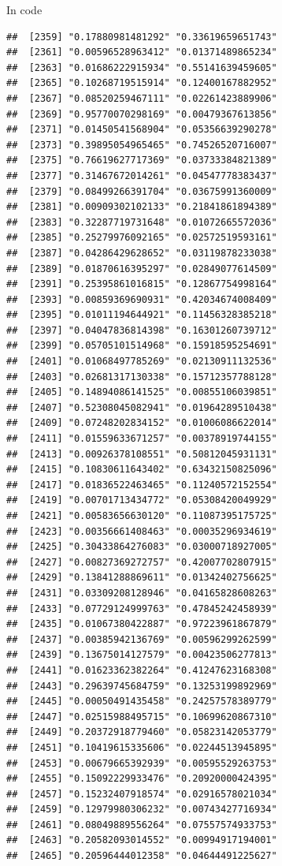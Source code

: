 \documentclass[ignorenonframetext,]{beamer}
\begin{document}
\begin{frame}[fragile]{In code}
\begin{verbatim}
##  [2359] "0.17880981481292" "0.33619659651743"
##  [2361] "0.00596528963412" "0.01371489865234"
##  [2363] "0.01686222915934" "0.55141639459605"
##  [2365] "0.10268719515914" "0.12400167882952"
##  [2367] "0.08520259467111" "0.02261423889906"
##  [2369] "0.95770070298169" "0.00479367613856"
##  [2371] "0.01450541568904" "0.05356639290278"
##  [2373] "0.39895054965465" "0.74526520716007"
##  [2375] "0.76619627717369" "0.03733384821389"
##  [2377] "0.31467672014261" "0.04547778383437"
##  [2379] "0.08499266391704" "0.03675991360009"
##  [2381] "0.00909302102133" "0.21841861894389"
##  [2383] "0.32287719731648" "0.01072665572036"
##  [2385] "0.25279976092165" "0.02572519593161"
##  [2387] "0.04286429628652" "0.03119878233038"
##  [2389] "0.01870616395297" "0.02849077614509"
##  [2391] "0.25395861016815" "0.12867754998164"
##  [2393] "0.00859369690931" "0.42034674008409"
##  [2395] "0.01011194644921" "0.11456328385218"
##  [2397] "0.04047836814398" "0.16301260739712"
##  [2399] "0.05705101514968" "0.15918595254691"
##  [2401] "0.01068497785269" "0.02130911132536"
##  [2403] "0.02681317130338" "0.15712357788128"
##  [2405] "0.14894086141525" "0.00855106039851"
##  [2407] "0.52308045082941" "0.01964289510438"
##  [2409] "0.07248202834152" "0.01006086622014"
##  [2411] "0.01559633671257" "0.00378919744155"
##  [2413] "0.00926378108551" "0.50812045931131"
##  [2415] "0.10830611643402" "0.63432150825096"
##  [2417] "0.01836522463465" "0.11240572152554"
##  [2419] "0.00701713434772" "0.05308420049929"
##  [2421] "0.00583656630120" "0.11087395175725"
##  [2423] "0.00356661408463" "0.00035296934619"
##  [2425] "0.30433864276083" "0.03000718927005"
##  [2427] "0.00827369272757" "0.42007702807915"
##  [2429] "0.13841288869611" "0.01342402756625"
##  [2431] "0.03309208128946" "0.04165828608263"
##  [2433] "0.07729124999763" "0.47845242458939"
##  [2435] "0.01067380422887" "0.97223961867879"
##  [2437] "0.00385942136769" "0.00596299262599"
##  [2439] "0.13675014127579" "0.00423506277813"
##  [2441] "0.01623362382264" "0.41247623168308"
##  [2443] "0.29639745684759" "0.13253199892969"
##  [2445] "0.00050491435458" "0.24257578389779"
##  [2447] "0.02515988495715" "0.10699620867310"
##  [2449] "0.20372918779460" "0.05823142053779"
##  [2451] "0.10419615335606" "0.02244513945895"
##  [2453] "0.00679665392939" "0.00595529263753"
##  [2455] "0.15092229933476" "0.20920000424395"
##  [2457] "0.15232407918574" "0.02916578021034"
##  [2459] "0.12979980306232" "0.00743427716934"
##  [2461] "0.08049889556264" "0.07557574933753"
##  [2463] "0.20582093014552" "0.00994917194001"
##  [2465] "0.20596444012358" "0.04644491225627"

\end{verbatim}
\end{frame}
\end{document}
